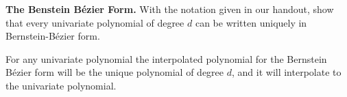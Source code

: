 \textbf{The Benstein B\'ezier Form.} With the notation given in our
handout, show that every univariate polynomial of degree $d$ can be
written uniquely in Bernstein-B\'ezier form.

{\color{blue}

For any univariate polynomial the interpolated polynomial for the
Bernstein B\'ezier form will be the unique polynomial of degree $d$,
and it will interpolate to the univariate polynomial.






}
